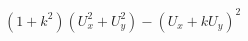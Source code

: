 \documentclass[border=2.5pt]{standalone}
\begin{document}
$\displaystyle (1+k^2)(U_x^2+U_y^2)-(U_x+kU_y)^2$
\end{document}
